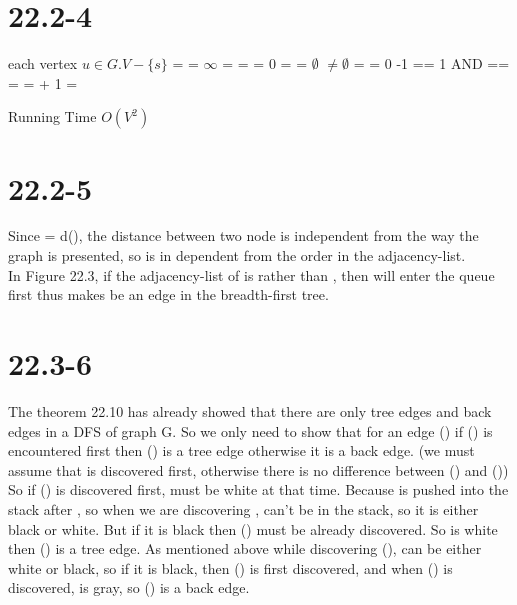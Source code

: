 \documentclass[a4paper]{article}
\begin{document}
\section*{22.2-4}
\begin{codebox}
\li \For each vertex $u \in G.V - \{s\}$
\li \Do {} = 
\li {} = $\infty$
\li {} =  \End
\li {} = 
\li {} = 0
\li {} = 
\li {} = $\emptyset$
\li {}
\li \While {} $\not=\emptyset$
\li \Do {} = 
\li \For {} = 0 \To {}-1
\li     \Do \If {} == 1 AND  == 
\li             \Do {} = 
\li             {} =  + 1
\li             {} = 
\li             {} \End\End\End
\end{codebox}
Running Time $O(V^2)$
\section*{22.2-5}
Since  = d(), the distance between two node is independent from the way the graph is presented, so  is in dependent from the order in the adjacency-list.\\
 In Figure 22.3, if the adjacency-list of  is  rather than , then  will enter the queue first thus makes  be an edge in the breadth-first tree.
 \section*{22.3-6}
 The theorem 22.10 has already showed that there are only tree edges and back edges in a DFS of graph G. So we only need to show that for an edge () if () is encountered first then () is a tree edge otherwise it is a back edge.  (we must assume that  is discovered first, otherwise there is no difference between () and ()) So if () is discovered first,  must be white at that time. Because  is pushed into the stack after , so when we are discovering ,  can't be in the stack, so it is either black or white. But if it is black then () must be already discovered. So  is white then ()  is a tree edge. As mentioned above while discovering (),  can be either white or black, so if it is black, then () is first discovered, and when () is discovered,  is gray, so () is a back edge.
\end{document}
